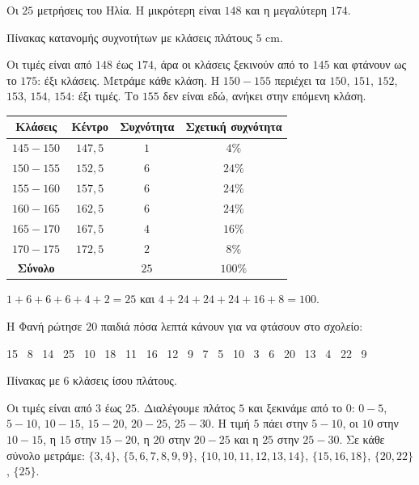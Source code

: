 
\tixero Οι $25$ μετρήσεις του Ηλία. Η μικρότερη είναι $148$ και η μεγαλύτερη $174$.\par
\tithelo Πίνακας κατανομής συχνοτήτων με κλάσεις πλάτους $5$ cm.\par
\possindeo Οι τιμές είναι από $148$ έως $174$, άρα οι κλάσεις ξεκινούν από το $145$ και φτάνουν ως το $175$: έξι κλάσεις. Μετράμε κάθε κλάση. Η $150-155$ περιέχει τα $150$, $151$, $152$, $153$, $154$, $154$: έξι τιμές. Το $155$ δεν είναι εδώ, ανήκει στην επόμενη κλάση.\par
\apantisi

\begin{center}
\renewcommand{\arraystretch}{1.25}
\begin{tabular}{cccc}
\toprule
\textbf{Κλάσεις} & \textbf{Κέντρο} & \textbf{Συχνότητα} & \textbf{Σχετική συχνότητα}\\
\midrule
$145-150$ & $147{,}5$ & $1$ & $4\%$\\
$150-155$ & $152{,}5$ & $6$ & $24\%$\\
$155-160$ & $157{,}5$ & $6$ & $24\%$\\
$160-165$ & $162{,}5$ & $6$ & $24\%$\\
$165-170$ & $167{,}5$ & $4$ & $16\%$\\
$170-175$ & $172{,}5$ & $2$ & $8\%$\\
\midrule
\textbf{Σύνολο} & & $25$ & $100\%$\\
\bottomrule
\end{tabular}
\end{center}

\elegxos $1+6+6+6+4+2=25$ και $4+24+24+24+16+8=100$.

\tixero Η Φανή ρώτησε $20$ παιδιά πόσα λεπτά κάνουν για να φτάσουν στο σχολείο:\par
\noindent\mbox{}\hfill 15 \ 8 \ 14 \ 25 \ 10 \ 18 \ 11 \ 16 \ 12 \ 9 \ 7 \ 5 \ 10 \ 3 \ 6 \ 20 \ 13 \ 4 \ 22 \ 9\hfill\mbox{}\par
\tithelo Πίνακας με $6$ κλάσεις ίσου πλάτους.\par
\possindeo Οι τιμές είναι από $3$ έως $25$. Διαλέγουμε πλάτος $5$ και ξεκινάμε από το $0$: $0-5$, $5-10$, $10-15$, $15-20$, $20-25$, $25-30$. Η τιμή $5$ πάει στην $5-10$, οι $10$ στην $10-15$, η $15$ στην $15-20$, η $20$ στην $20-25$ και η $25$ στην $25-30$. Σε κάθε σύνολο μετράμε: $\{3,4\}$, $\{5,6,7,8,9,9\}$, $\{10,10,11,12,13,14\}$, $\{15,16,18\}$, $\{20,22\}$, $\{25\}$.\par
\apantisi

